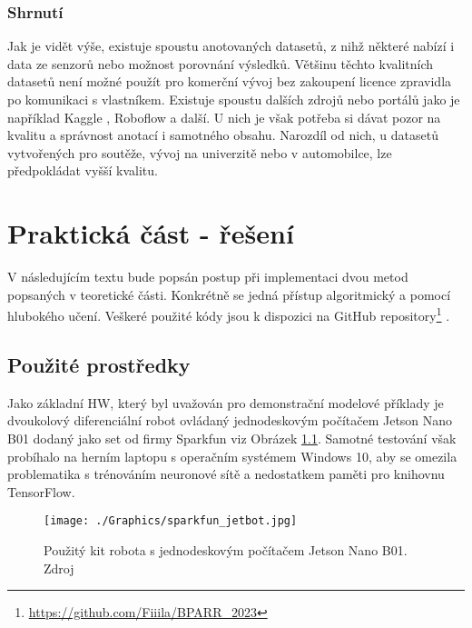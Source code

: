 \documentclass[czech, bc, kky, he, iso690numb]{fasthesis}
\begin{document}
  			\subsection{Shrnutí}
  				Jak je vidět výše, existuje spoustu anotovaných datasetů, z nihž některé nabízí i data ze senzorů nebo možnost porovnání výsledků. Většinu těchto kvalitních datasetů není možné použít pro komerční vývoj bez zakoupení licence zpravidla po komunikaci s vlastníkem. Existuje spoustu dalších zdrojů nebo portálů jako je například Kaggle \cite{Kaggle}, Roboflow \cite{Roboflow} a další. U nich je však potřeba si dávat pozor na kvalitu a správnost anotací i samotného obsahu. Narozdíl od nich, u datasetů vytvořených pro soutěže, vývoj na univerzitě nebo v automobilce, lze předpokládat vyšší kvalitu.
    \chapter{Praktická část - řešení}
        V následujícím textu bude popsán postup při implementaci dvou metod popsaných v teoretické části. Konkrétně se jedná přístup algoritmický a pomocí hlubokého učení. Veškeré použité kódy jsou k dispozici na GitHub repository\footnote{\href{https://github.com/Fiiila/BPARR_2023}{https://github.com/Fiiila/BPARR\_2023}} \cite{github_repo}.
        \section{Použité prostředky}
            Jako základní HW, který byl uvažován pro demonstrační modelové příklady je dvoukolový diferenciální robot ovládaný jednodeskovým počítačem Jetson Nano B01 dodaný jako set od firmy Sparkfun viz Obrázek \ref{pic:sparkfun_jetbot}. Samotné testování však probíhalo na herním laptopu s operačním systémem Windows 10, aby se omezila problematika s trénováním neuronové sítě a nedostatkem paměti pro knihovnu TensorFlow.
            
            	\begin{figure}[h]
            		\centering
            		\texttt{[image: ./Graphics/sparkfun\_jetbot.jpg]}
            		\caption{Použitý kit robota s jednodeskovým počítačem Jetson Nano B01. Zdroj \cite{sparkfun_jetbot} }
            		\label{pic:sparkfun_jetbot}
            	\end{figure}
            	
\end{document}
